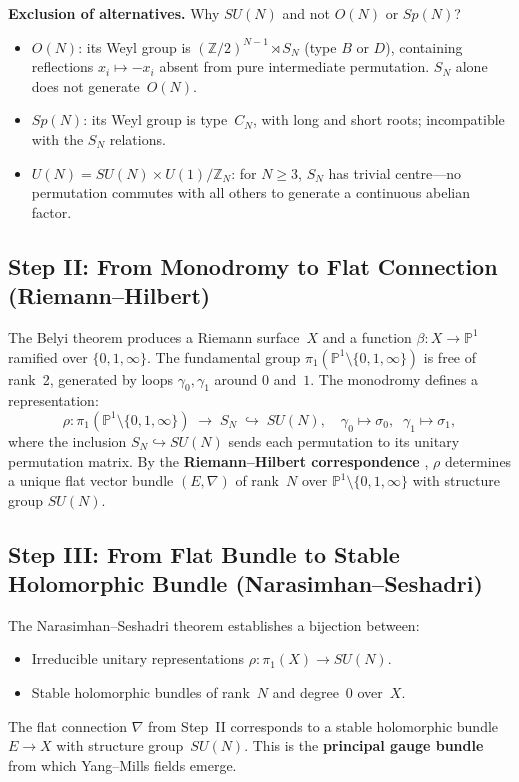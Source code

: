 \documentclass[11pt, a4paper, openany]{book}
\begin{document}
\textbf{Exclusion of alternatives.} Why $SU(N)$ and not $O(N)$ or
$Sp(N)$?
\begin{itemize}
  \item $O(N)$: its Weyl group is
    $(\mathbb{Z}/2)^{N-1} \rtimes S_N$ (type $B$ or $D$), containing
    reflections $x_i \mapsto -x_i$ absent from pure intermediate
    permutation. $S_N$ alone does not generate~$O(N)$.
  \item $Sp(N)$: its Weyl group is type~$C_N$, with long and short
    roots; incompatible with the $S_N$ relations.
  \item $U(N) = SU(N) \times U(1)/\mathbb{Z}_N$: for $N \ge 3$,
    $S_N$ has trivial centre---no permutation commutes with all others
    to generate a continuous abelian factor.
\end{itemize}

\subsection{Step II: From Monodromy to Flat Connection
  (Riemann--Hilbert)}

The Belyi theorem produces a Riemann surface~$X$ and a function
$\beta : X \to \mathbb{P}^1$ ramified over $\{0, 1, \infty\}$. The
fundamental group
$\pi_1(\mathbb{P}^1 \setminus \{0, 1, \infty\})$ is free of rank~2,
generated by loops $\gamma_0, \gamma_1$ around $0$ and~$1$. The
monodromy defines a representation:
\[
  \rho : \pi_1(\mathbb{P}^1 \setminus \{0,1,\infty\})
  \;\longrightarrow\; S_N \;\hookrightarrow\; SU(N),
  \quad \gamma_0 \mapsto \sigma_0,\;\; \gamma_1 \mapsto \sigma_1,
\]
where the inclusion $S_N \hookrightarrow SU(N)$ sends each permutation
to its unitary permutation matrix. By the \textbf{Riemann--Hilbert
correspondence} \cite{deligne1970}, $\rho$ determines a unique flat
vector bundle $(E, \nabla)$ of rank~$N$ over
$\mathbb{P}^1 \setminus \{0,1,\infty\}$ with structure group
$SU(N)$.

\subsection{Step III: From Flat Bundle to Stable Holomorphic Bundle
  (Narasimhan--Seshadri)}

The Narasimhan--Seshadri theorem \cite{narasimhan1965} establishes a
bijection between:
\begin{itemize}
  \item Irreducible unitary representations
    $\rho : \pi_1(X) \to SU(N)$.
  \item Stable holomorphic bundles of rank~$N$ and degree~0 over~$X$.
\end{itemize}
The flat connection $\nabla$ from Step~II corresponds to a stable
holomorphic bundle $E \to X$ with structure group~$SU(N)$. This is the
\textbf{principal gauge bundle} from which Yang--Mills fields emerge.
\end{document}

